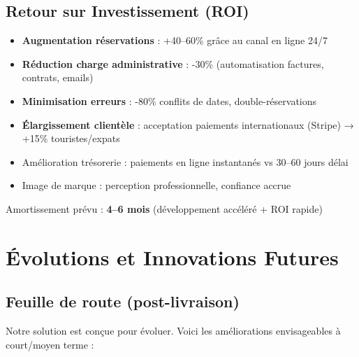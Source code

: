 \documentclass[12pt, a4paper]{article}
\begin{document}
\subsection{Retour sur Investissement (ROI)}

\begin{itemize}[leftmargin=*,noitemsep]
  \item \textbf{Augmentation réservations} : +40--60\% grâce au canal en ligne 24/7
  \item \textbf{Réduction charge administrative} : -30\% (automatisation factures, contrats, emails)
  \item \textbf{Minimisation erreurs} : -80\% conflits de dates, double-réservations
  \item \textbf{Élargissement clientèle} : acceptation paiements internationaux (Stripe) → +15\% touristes/expats
  \item Amélioration trésorerie : paiements en ligne instantanés vs 30--60 jours délai
  \item Image de marque : perception professionnelle, confiance accrue
\end{itemize}

\vspace{0.5cm}
\noindent Amortissement prévu : \textbf{4--6 mois} (développement accéléré + ROI rapide)

\section{Évolutions et Innovations Futures}

\subsection{Feuille de route (post-livraison)}

Notre solution est conçue pour évoluer. Voici les améliorations envisageables à court/moyen terme :
\end{document}
